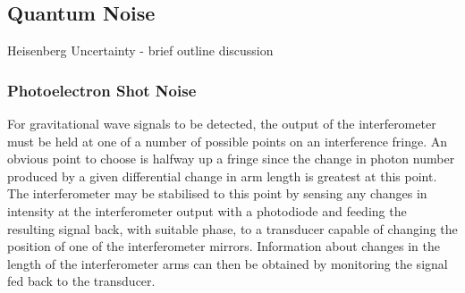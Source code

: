 \documentclass{article}
\begin{document}



\subsection{Quantum Noise}
\label{subsection:quantumnoise}

Heisenberg Uncertainty - brief outline discussion

\subsubsection{Photoelectron Shot Noise}
\label{subsubsection:shotnoise}

For gravitational wave signals to be detected, the output of the
interferometer must be held at one of a number of possible points on
an interference fringe. An obvious point to choose is halfway up a
fringe since the change in photon number produced by a given
differential change in arm length is greatest at this point.  The
interferometer may be stabilised to this point by sensing any changes
in intensity at the interferometer output with a photodiode and
feeding the resulting signal back, with suitable phase, to a
transducer capable of changing the position of one of the
interferometer mirrors.  Information about changes in the length of
the interferometer arms can then be obtained by monitoring the signal
fed back to the transducer.
\end{document}
